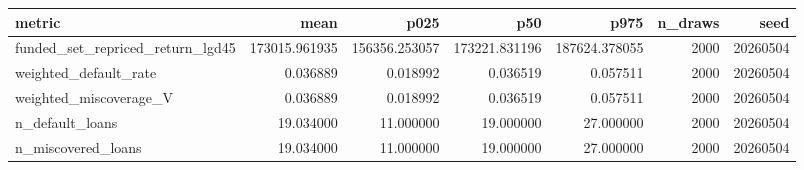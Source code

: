 \begin{tabular}{lrrrrrr}
\toprule
metric & mean & p025 & p50 & p975 & n\_draws & seed \\
\midrule
funded\_set\_repriced\_return\_lgd45 & 173015.961935 & 156356.253057 & 173221.831196 & 187624.378055 & 2000 & 20260504 \\
weighted\_default\_rate & 0.036889 & 0.018992 & 0.036519 & 0.057511 & 2000 & 20260504 \\
weighted\_miscoverage\_V & 0.036889 & 0.018992 & 0.036519 & 0.057511 & 2000 & 20260504 \\
n\_default\_loans & 19.034000 & 11.000000 & 19.000000 & 27.000000 & 2000 & 20260504 \\
n\_miscovered\_loans & 19.034000 & 11.000000 & 19.000000 & 27.000000 & 2000 & 20260504 \\
\bottomrule
\end{tabular}
